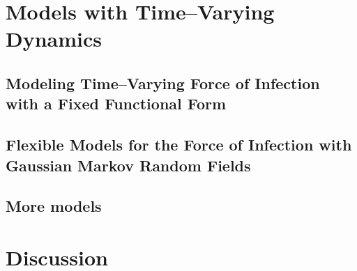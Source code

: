 \section{Models with Time--Varying Dynamics}
\label{sec:flu_tparam_models}

\subsection{Modeling Time--Varying Force of Infection with a Fixed Functional Form}
\label{subsec:flu_quadfoi}

\subsection{Flexible Models for the Force of Infection with Gaussian Markov Random Fields}
\label{subsec:flu_gmrf}

\subsection{More models}

\section{Discussion}